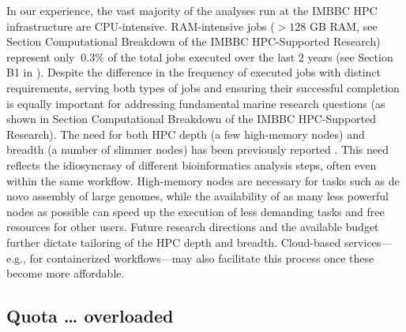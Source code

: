    In our experience, the vast majority of the analyses run at the IMBBC HPC infrastructure are CPU-intensive. 
   RAM-intensive jobs ($>128$ GB RAM, see Section Computational Breakdown of the IMBBC HPC-Supported Research) represent only $~0.3\%$ of the total jobs executed over the last $2$ years (see Section B1 in \citep{haris_zafeiropoulos_2021_4665308}). 
   Despite the difference in the frequency of executed jobs with distinct requirements, serving both types of jobs and ensuring their successful completion is equally important for addressing fundamental marine research questions (as shown in Section Computational Breakdown of the IMBBC HPC-Supported Research). 
   The need for both HPC depth (a few high-memory nodes) and breadth (a number of slimmer nodes) has been previously reported \citep{lampa2013lessons}. 
   This need reflects the idiosyncrasy of different bioinformatics analysis steps, often even within the same workflow. 
   High-memory nodes are necessary for tasks such as de novo assembly of large genomes, while the availability of as many less powerful nodes as possible can speed up the execution of less demanding tasks and free resources for other users. 
   Future research directions and the available budget further dictate tailoring of the HPC depth and breadth. Cloud-based services—e.g., for containerized workflows—may also facilitate this process once these become more affordable.

   \subsection*{Quota … overloaded}

